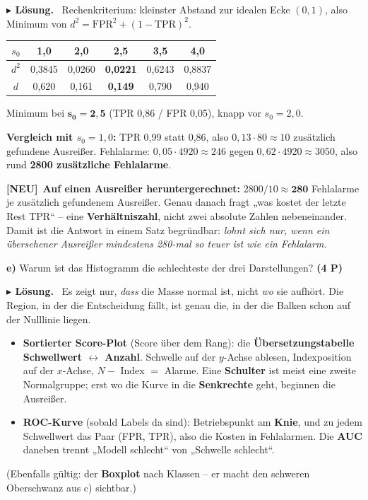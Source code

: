 \documentclass[10pt,a4paper]{article}
\newcommand{\pkt}[1]{\hfill\textbf{(#1 P)}}
\newcommand{\neu}{{\color{neurot}\footnotesize\bfseries[NEU]}\ }
\newenvironment{loes}%
  {\par\vspace{2pt}\begingroup\small\noindent\textbf{\color{loesfarbe}$\blacktriangleright$ Lösung.}\ }%
  {\endgroup\par\vspace{5pt}}
\begin{document}
\begin{loes}
Rechenkriterium: kleinster Abstand zur idealen Ecke $(0,1)$, also Minimum von
$d^2 = \text{FPR}^2 + (1-\text{TPR})^2$.
\begin{center}\small
\begin{tabular}{|c|c|c|c|c|c|}
\hline
$s_0$ & 1,0 & 2,0 & \textbf{2,5} & 3,5 & 4,0\\ \hline
$d^2$ & 0,3845 & 0,0260 & \textbf{0,0221} & 0,6243 & 0,8837\\ \hline
$d$ & 0,620 & 0,161 & \textbf{0,149} & 0,790 & 0,940\\ \hline
\end{tabular}
\end{center}
Minimum bei $\mathbf{s_0 = 2{,}5}$ (TPR 0,86 / FPR 0,05), knapp vor $s_0=2{,}0$.

\textbf{Vergleich mit $s_0=1{,}0$:} TPR 0,99 statt 0,86, also $0{,}13\cdot80 \approx 10$
zusätzlich gefundene Ausreißer. Fehlalarme: $0{,}05\cdot4920 \approx 246$ gegen
$0{,}62\cdot4920 \approx 3050$, also rund \textbf{2800 zusätzliche Fehlalarme}.

\neu \textbf{Auf einen Ausreißer heruntergerechnet:} $2800/10 \approx \mathbf{280}$ Fehlalarme je
zusätzlich gefundenem Ausreißer. Genau danach fragt „was kostet der letzte Rest TPR`` -- eine
\textbf{Verhältniszahl}, nicht zwei absolute Zahlen nebeneinander. Damit ist die Antwort in einem
Satz begründbar: \emph{lohnt sich nur, wenn ein übersehener Ausreißer mindestens 280-mal so teuer
ist wie ein Fehlalarm.}
\end{loes}

\textbf{e)} Warum ist das Histogramm die schlechteste der drei Darstellungen? \pkt{4}

\begin{loes}
Es zeigt nur, \emph{dass} die Masse normal ist, nicht \emph{wo} sie aufhört. Die Region, in der die
Entscheidung fällt, ist genau die, in der die Balken schon auf der Nulllinie liegen.
\begin{itemize}
\item \textbf{Sortierter Score-Plot} (Score über dem Rang): die \textbf{Übersetzungstabelle
  Schwellwert $\leftrightarrow$ Anzahl}. Schwelle auf der $y$-Achse ablesen, Indexposition auf der
  $x$-Achse, $N -$ Index $=$ Alarme. Eine \textbf{Schulter} ist meist eine zweite Normalgruppe;
  erst wo die Kurve in die \textbf{Senkrechte} geht, beginnen die Ausreißer.
\item \textbf{ROC-Kurve} (sobald Labels da sind): Betriebspunkt am \textbf{Knie}, und zu jedem
  Schwellwert das Paar (FPR, TPR), also die Kosten in Fehlalarmen. Die \textbf{AUC} daneben trennt
  „Modell schlecht`` von „Schwelle schlecht``.
\end{itemize}
(Ebenfalls gültig: der \textbf{Boxplot} nach Klassen -- er macht den schweren Oberschwanz aus c)
sichtbar.)
\end{loes}
\end{document}
